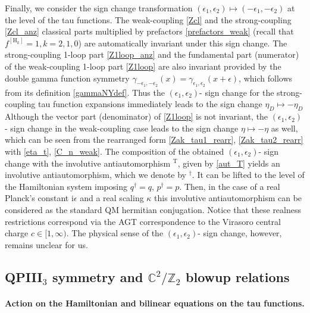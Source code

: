 \documentclass[12pt,a4paper]{article}
\numberwithin{equation}{section}
\newcommand{\ri}{\mathrm{i}}
\newcommand{\D}{\scriptscriptstyle{D}}
\begin{document}
Finally, we consider the sign change transformation $(\epsilon_1,\epsilon_2)\mapsto(-\epsilon_1,-\epsilon_2)$ at the level of the tau functions. The weak-coupling \eqref{Zcl} and the strong-coupling  \eqref{Zcl_anz} classical parts multiplied by prefactors \eqref{prefactors_weak} (recall that $f^{[\mathrm{H}_k]}=1,{\scriptstyle k=2,1,0}$) are automatically invariant under this sign change. 
The strong-coupling 1-loop part \eqref{Z1loop_anz} and the fundamental part (numerator) of the weak-coupling 1-loop part \eqref{Z1loop}
are also invariant provided by the double gamma function symmetry $\gamma_{-\epsilon_1,-\epsilon_2}(x)=\gamma_{\epsilon_1,\epsilon_2}(x+\epsilon)$, which follows from its definition \eqref{gammaNYdef}. Thus the $(\epsilon_1,\epsilon_2)$- sign change for the strong-coupling tau function expansions immediately leads to the sign change $\eta_{\D}\mapsto -\eta_{\D}$ Although the vector part (denominator) of \eqref{Z1loop} is not invariant, the $(\epsilon_1,\epsilon_2)$- sign change in the weak-coupling case leads to the sign change $\eta\mapsto -\eta$ as well, which can be seen from the rearranged form \eqref{Zak_tau1_rearr}, \eqref{Zak_tau2_rearr} with \eqref{eta_t}, \eqref{C_n_weak}. The composition of the obtained $(\epsilon_1,\epsilon_2)$- sign change with the involutive antiautomorphism $^\mathrm{T}$, given by \eqref{aut_T} yields an involutive antiautomorphism, which we denote by $^\dagger$. It can be lifted to the level of the Hamiltonian system imposing $q^\dagger=q,\,p^\dagger=p$. Then, in the case of a real Planck's constant $\ri\epsilon$ and a real scaling $\kappa$ this involutive antiautomorphism can be considered as the standard QM hermitian conjugation. Notice that these realness restrictions correspond via the AGT correspondence \cite{AGT09} to the Virasoro central charge $c\in [1,\infty)$. The physical sense of the $(\epsilon_1,\epsilon_2)$- sign change, however, remains unclear for us.

\subsection{QPIII$_3$ symmetry and $\mathbb{C}^2/\mathbb{Z}_2$ blowup relations}
\label{ssec:C2}

\paragraph{Action on the Hamiltonian and bilinear equations on the tau functions.}
\end{document}
